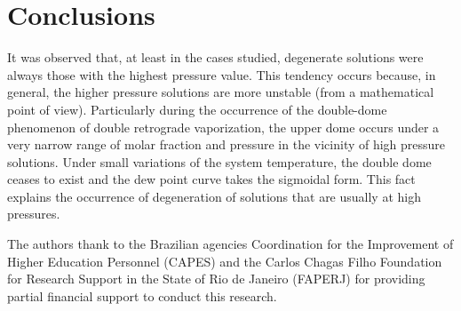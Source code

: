 \documentclass[journal=iecred,manuscript=article]{achemso}
\theoremstyle{definition}
\theoremstyle{remark}
\begin{document}
\section{Conclusions}

It was observed that, at least in the cases studied, degenerate solutions were always those with the highest pressure value. This tendency occurs because, in general, the higher pressure solutions are more unstable (from a mathematical point of view). Particularly during the occurrence of the double-dome phenomenon of double retrograde vaporization, the upper dome occurs under a very narrow range of molar fraction and pressure in the vicinity of high pressure solutions. Under small variations of the system temperature, the double dome ceases to exist and the dew point curve takes the sigmoidal form. This fact explains the occurrence of degeneration of solutions that are usually at high pressures.

\begin{acknowledgement}

The authors thank to the Brazilian agencies Coordination for the Improvement of Higher Education Personnel (CAPES) and the Carlos Chagas Filho Foundation for Research Support in the State of Rio de Janeiro (FAPERJ) for providing partial financial support to conduct this research.

\end{acknowledgement}


\end{document}
